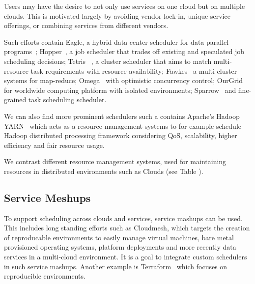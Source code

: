 \documentclass[final,5p,times,twocolumn]{elsarticle}
\begin{document}
Users may have the desire to not only use services on one cloud but on
multiple clouds. This is motivated largely by avoiding vendor lock-in,
unique service offerings, or combining services from different
vendors.



Such efforts contain Eagle, a hybrid data center scheduler for
data-parallel programs~\cite{delgado2016job};
Hopper~\cite{ren2015hopper}, a job scheduler that trades off existing
and speculated job scheduling decisions; Tetris
~\cite{grandl2015multi}, a cluster scheduler that aims to match
multi-resource task requirements with resource availability;
Fawkes~\cite{ghit2014balanced} a multi-cluster systems for map-reduce;
Omega~\cite{schwarzkopf2013omega} with optimistic concurrency control;
OurGrid~\cite{andrade2003ourgrid,cirne2006labs} for worldwide
computing platform with isolated environments;
Sparrow~\cite{ousterhout2013sparrow} and fine-grained task scheduling
scheduler.
  
We can also find more prominent schedulers such a contains Apache's
  Hadoop YARN~\cite{vavilapalli2013apache} which acts as a resource
  management systems to for example schedule Hadoop distributed
  processing framework considering QoS, scalability, higher efficiency
  and fair resource usage.

We contrast different resource management systems, used for
maintaining resources in distributed environments such as Clouds (see
Table \label{T:distr-cloud}).

\subsection{Service Meshups} 
\label{sec:mesh}

To support scheduling across clouds and services, service mashups can
  be used. This includes long standing efforts such as Cloudmesh,
  which targets the creation of reproducable environments to easily
  manage virtual machines, bare metal provisioned operating systems,
  platform deployments and more recently data services in a
  multi-cloud environment. It is a goal to integrate custom schedulers
  in such service mashups. Another example is
  Terraform~\cite{www-terraform} which focuses on reproducible
  environments.




\end{document}
